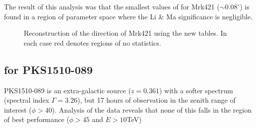 \documentclass[main.tex]{subfiles}
\begin{document}
The result of this analysis was that the smallest values of \rse for Mrk421 ($\sim 0.08^\circ$) is found in a region of parameter space where the Li \& Ma significance is negligible.

\begin{figure}[H]
  \begin{center}
  \end{center}
  \caption[Mrk421 direction reconstruction using Method5t.]{Reconstruction of the direction of Mrk421 using the new \disp tables. In each case red denotes regions of no statistics.}
  \label{fig:mrk_disp}
\end{figure}

\subsection{\rse for PKS1510-089}
PKS1510-089 is an extra-galactic source ($z=0.361$) with a softer spectrum (spectral index $\Gamma=3.26$), but 17 hours of observation in the zenith range of interest ($\phi>40$). Analysis of the data reveals that none of this falls in the region of best performance ($\phi>45$ and $E>10$TeV)

\end{document}
